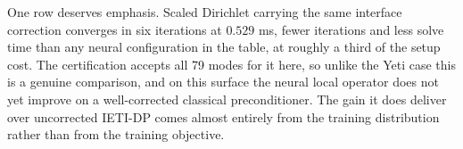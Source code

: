 \documentclass{article}
\theoremstyle{plain}
\numberwithin{equation}{section}
\begin{document}
One row deserves emphasis.  Scaled Dirichlet carrying the same interface
correction converges in six iterations at $0.529$ ms, fewer iterations and
less solve time than any neural configuration in the table, at roughly a third
of the setup cost.  The certification accepts all 79 modes for it here, so
unlike the Yeti case this is a genuine comparison, and on this surface the
neural local operator does not yet improve on a well-corrected classical
preconditioner.  The gain it does deliver over uncorrected IETI-DP comes
almost entirely from the training distribution rather than from the training
objective.

\FloatBarrier




%     
\end{document}
